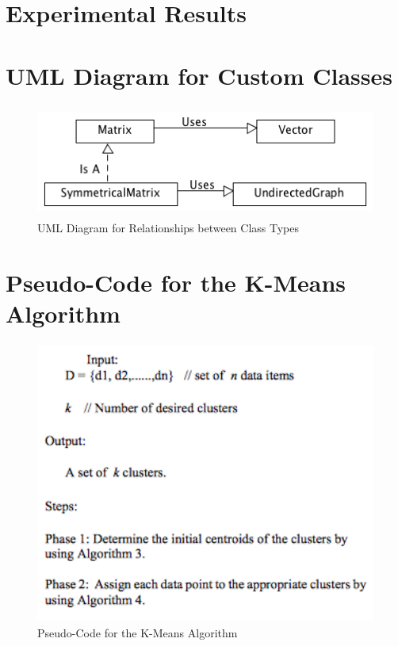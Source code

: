 \documentclass[12pt]{article}
\begin{document}
\newpage
\section{Experimental Results}

\newpage
\appendix
\appendixpage
\addappheadtotoc

\section{UML Diagram for Custom Classes}
\label{appendix:uml}
\begin{figure}[!htb]
\begin{center}
	\includegraphics[height=10em]{uml.png}
	\caption{UML Diagram for Relationships between Class Types}
	\label{uml}
\end{center}
\end{figure}

\newpage
\section{Pseudo-Code for the K-Means Algorithm}
\label{appendix:kmeans}
\begin{figure}[!htb]
\begin{center}
	\includegraphics[height=25em]{kmeans.png}
	\caption{Pseudo-Code for the K-Means Algorithm}
	\label{uml}
\end{center}
\end{figure}
\end{document}
